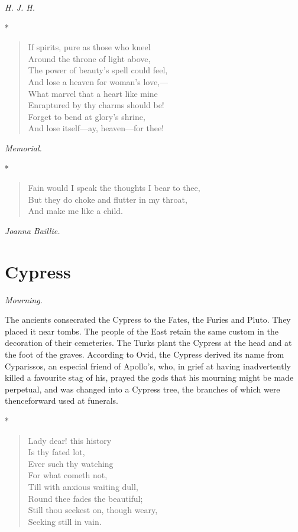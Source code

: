 \documentclass[11pt,twoside]{article}
\newcommand\flower[2]{\section*{#1}\addcontentsline{toc}{section}{#1}%
  \noindent\textit{#2.}\par\medskip}
\newcommand\stars{\begin{center}*\quad*\quad*\end{center}}
\newcommand\by[1]{\par\hfill\textit{#1}\par}
\begin{document}
\by{H. J. H.}

\stars

\begin{verse}
If spirits, pure as those who kneel\\
\quad Around the throne of light above,\\
The power of beauty’s spell could feel,\\
\quad And lose a heaven for woman’s love,---\\
What marvel that a heart like mine\\
\quad Enraptured by thy charms should be!\\
Forget to bend at glory’s shrine,\\
\quad And lose itself---ay, heaven---for thee!
\end{verse}

\by{Memorial.}

\stars

\begin{verse}
Fain would I speak the thoughts I bear to thee,\\
But they do choke and flutter in my throat,\\
And make me like a child.
\end{verse}

\by{Joanna Baillie.}

\flower{Cypress}{Mourning}

The ancients consecrated the Cypress to the Fates, the Furies and Pluto. They placed it near tombs. The people of the East retain the same custom in the decoration of their cemeteries. The Turks plant the Cypress at the head and at the foot of the graves. According to Ovid, the Cypress derived its name from Cyparissos, an especial friend of Apollo’s, who, in grief at having inadvertently killed a favourite stag of his, prayed the gods that his mourning might be made perpetual, and was changed into a Cypress tree, the branches of which were thenceforward used at funerals.

\stars

\begin{verse}
Lady dear! this history\\
\quad Is thy fated lot,\\
Ever such thy watching\\
\quad For what cometh not,\\
Till with anxious waiting dull,\\
Round thee fades the beautiful;\\
Still thou seekest on, though weary,\\
\quad Seeking still in vain.
\end{verse}
\end{document}
